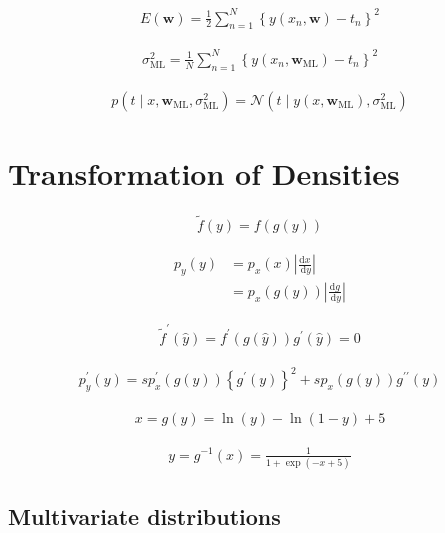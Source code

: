 \documentclass{article}
\begin{document}
\begin{align*}
E(\mathbf{w}) = \frac{1}{2} \sum_{n=1}^{N} \left\{ y(x_n, \mathbf{w}) - t_n \right\}^{2}
\tag{2.67}
\end{align*}

\begin{align*}
\sigma_{\mathrm{ML}}^{2} = \frac{1}{N} \sum_{n=1}^{N} \left\{ y(x_n, \mathbf{w}_{\mathrm{ML}}) - t_n \right\}^{2}
\tag{2.68}
\end{align*}

\begin{align*}
p\left( t \mid x, \mathbf{w}_{\mathrm{ML}}, \sigma_{\mathrm{ML}}^{2} \right) = \mathcal{N}\left( t \mid y(x, \mathbf{w}_{\mathrm{ML}}), \sigma_{\mathrm{ML}}^{2} \right)
\tag{2.69}
\end{align*}

\section{Transformation of Densities}

\begin{align*}
\widetilde{f}(y) = f(g(y)) 
\tag{2.70}
\end{align*}

\begin{align*}
p_{y}(y) & = p_{x}(x)\left|\frac{\mathrm{d} x}{\mathrm{~d} y}\right| \\
& = p_{x}(g(y))\left|\frac{\mathrm{d} g}{\mathrm{~d} y}\right|
\tag{2.71}
\end{align*}

\begin{align*}
\tilde{f}^{\prime}(\widehat{y}) = f^{\prime}(g(\widehat{y})) g^{\prime}(\widehat{y}) = 0
\tag{2.72}
\end{align*}

\begin{align*}
p_{y}^{\prime}(y) = s p_{x}^{\prime}(g(y))\left\{g^{\prime}(y)\right\}^{2} + s p_{x}(g(y)) g^{\prime \prime}(y)
\tag{2.73}
\end{align*}

\begin{align*}
x = g(y) = \ln (y) - \ln (1 - y) + 5
\tag{2.74}
\end{align*}

\begin{align*}
y = g^{-1}(x) = \frac{1}{1 + \exp (-x + 5)}
\tag{2.75}
\end{align*}

\subsection{Multivariate distributions}
\end{document}
